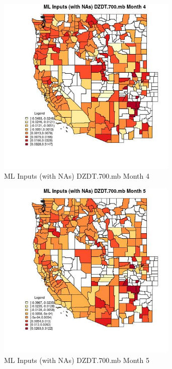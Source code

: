 \begin{figure} 
\centering  
\includegraphics[width=0.77\textwidth]{Code_Outputs/Report_ML_input_PM25_Step4_part_f_de_duplicated_aveswNAs_CountyDZDT700mbmedianMonth4.jpg} 
\caption{\label{fig:Report_ML_input_PM25_Step4_part_f_de_duplicated_aveswNAsCountyDZDT700mbmedianMonth4}ML Inputs (with NAs) DZDT.700.mb Month 4} 
\end{figure} 
 

\begin{figure} 
\centering  
\includegraphics[width=0.77\textwidth]{Code_Outputs/Report_ML_input_PM25_Step4_part_f_de_duplicated_aveswNAs_CountyDZDT700mbmedianMonth5.jpg} 
\caption{\label{fig:Report_ML_input_PM25_Step4_part_f_de_duplicated_aveswNAsCountyDZDT700mbmedianMonth5}ML Inputs (with NAs) DZDT.700.mb Month 5} 
\end{figure} 
 

